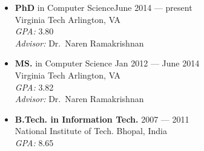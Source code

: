 
%
\begin{itemize}
  \setlength\itemsep{.1em}
    \item \textbf{PhD} in Computer Science\hfill June 2014 --- present\\
        Virginia Tech \hfill Arlington, VA\\
        \textit{GPA:} 3.80 \\
        \textit{Advisor:} Dr.\ Naren Ramakrishnan
    
    \item \textbf{MS.} in Computer Science \hfill Jan 2012 --- June 2014\\
        Virginia Tech \hfill Arlington, VA \\
        \textit{GPA:} 3.82 \\
        \textit{Advisor:} Dr.\ Naren Ramakrishnan
    
    \item \textbf{B.Tech. in Information Tech.} \hfill 2007 --- 2011\\
        National Institute of Tech. \hfill Bhopal, India\\
        \textit{GPA:} 8.65
\end{itemize}
